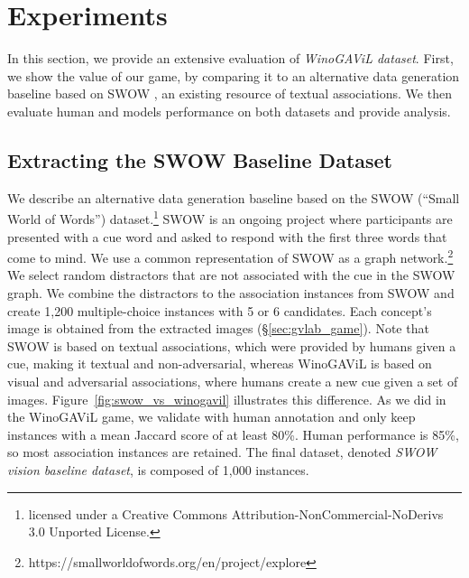 \documentclass{article}
\newcommand{\ouracronym}[0]{WinoGAViL}
\newcommand{\swowsplit}[0]{\emph{\textit{SWOW} vision baseline dataset}}
\newcommand{\gamesplit}[0]{\emph{\textit{\ouracronym{}} dataset}}
\begin{document}
\section{Experiments}
\label{sec:experiments}
In this section, we provide an extensive evaluation of \gamesplit{}. First, we show the value of our game, by comparing it to an alternative data generation baseline based on SWOW \cite{thawani2019swow}, an existing resource of textual associations. We then evaluate human and models performance on both datasets and provide analysis. 
\subsection{Extracting the SWOW Baseline Dataset}\label{sec:swow}
We describe an alternative data generation baseline based on the SWOW (``Small World of Words'') dataset.\footnote{licensed under a Creative Commons Attribution-NonCommercial-NoDerivs 3.0 Unported License.} SWOW is an ongoing project where participants are presented with a cue word and asked to respond with the first three words that come to mind. We use a common representation of SWOW as a graph network.\footnote{https://smallworldofwords.org/en/project/explore} We select random distractors that are not associated with the cue in the SWOW graph. We combine the distractors to the association instances from SWOW and create 1,200 multiple-choice instances with 5 or 6 candidates. Each concept's image is obtained from the extracted images (§\ref{sec:gvlab_game}). Note that SWOW is based on textual associations, which were provided by humans given a cue, making it textual and non-adversarial, whereas WinoGAViL is based on visual and adversarial associations, where humans create a new cue given a set of images. Figure~\ref{fig:swow_vs_winogavil} illustrates this difference. As we did in the \ouracronym{} game, we validate with human annotation and only keep instances with a mean Jaccard score of at least 80\%. Human performance is 85\%, so most association instances are retained. The final dataset, denoted \swowsplit{}, is composed of 1,000 instances. 
 
\end{document}
